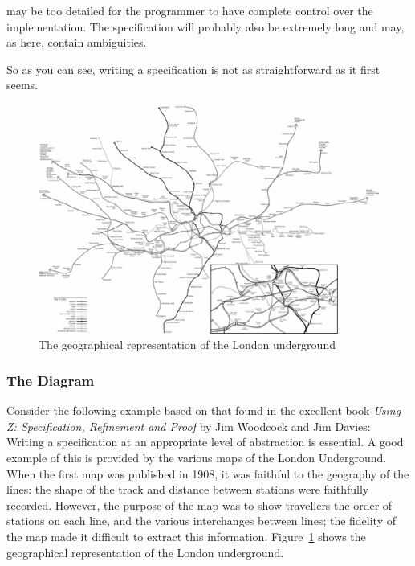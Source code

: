 may be too detailed for the programmer to have complete control over the 
implementation. The specification will probably also be extremely long and 
may, as here, contain ambiguities. 

So as you can see, writing a specification is not as straightforward as it 
first seems. 

\begin{figure}
\centering
\includegraphics[width=5in]{geog}
\caption{\small The geographical representation of the London
                underground\label{train1}}
\end{figure}


\subsubsection{The Diagram}

Consider the following example based on that found in the excellent book 
{\em Using Z:
Specification, Refinement and Proof} by Jim Woodcock and Jim Davies:  \\

\noindent
Writing a specification at an appropriate level of abstraction is essential. 
A good example of this is provided by the various maps of the London 
Underground. When the first map was published in 1908, it was faithful to the 
geography of the lines: the shape of the track and distance between stations 
were faithfully recorded. However, the purpose of the map was to show 
travellers the order of stations on each line, and the various interchanges
between lines; the fidelity of the map made it difficult to extract this 
information. Figure~\ref{train1} shows the geographical representation of the 
London underground. \\

